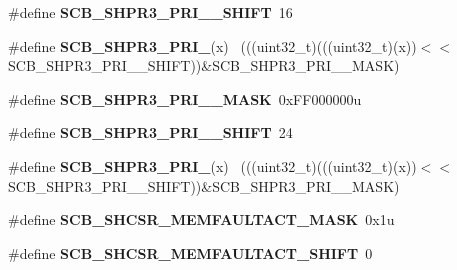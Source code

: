 \begin{DoxyCompactItemize}
\item 
\hypertarget{group___s_c_b___register___masks_ga10c07d5bebf4f0032304b2d73da48a48}{}\#define {\bfseries S\+C\+B\+\_\+\+S\+H\+P\+R3\+\_\+\+P\+R\+I\+\_\+\_\+\+S\+H\+I\+F\+T}~16\label{group___s_c_b___register___masks_ga10c07d5bebf4f0032304b2d73da48a48}

\item 
\hypertarget{group___s_c_b___register___masks_gac0a05c0c7e3f7ddc6285c653c190a2d7}{}\#define {\bfseries S\+C\+B\+\_\+\+S\+H\+P\+R3\+\_\+\+P\+R\+I\+\_}(x)                                        ~(((uint32\+\_\+t)(((uint32\+\_\+t)(x))$<$$<$S\+C\+B\+\_\+\+S\+H\+P\+R3\+\_\+\+P\+R\+I\+\_\+\_\+\+S\+H\+I\+F\+T))\&S\+C\+B\+\_\+\+S\+H\+P\+R3\+\_\+\+P\+R\+I\+\_\+\_\+\+M\+A\+S\+K)\label{group___s_c_b___register___masks_gac0a05c0c7e3f7ddc6285c653c190a2d7}

\item 
\hypertarget{group___s_c_b___register___masks_gad0d8244bc4b757250164da7a7f5406ce}{}\#define {\bfseries S\+C\+B\+\_\+\+S\+H\+P\+R3\+\_\+\+P\+R\+I\+\_\+\_\+\+M\+A\+S\+K}~0x\+F\+F000000u\label{group___s_c_b___register___masks_gad0d8244bc4b757250164da7a7f5406ce}

\item 
\hypertarget{group___s_c_b___register___masks_ga28a5f46e257ba81d93a426436b8c795a}{}\#define {\bfseries S\+C\+B\+\_\+\+S\+H\+P\+R3\+\_\+\+P\+R\+I\+\_\+\_\+\+S\+H\+I\+F\+T}~24\label{group___s_c_b___register___masks_ga28a5f46e257ba81d93a426436b8c795a}

\item 
\hypertarget{group___s_c_b___register___masks_gaab039efcc046b9e78aa68a70957a4194}{}\#define {\bfseries S\+C\+B\+\_\+\+S\+H\+P\+R3\+\_\+\+P\+R\+I\+\_}(x)                                        ~(((uint32\+\_\+t)(((uint32\+\_\+t)(x))$<$$<$S\+C\+B\+\_\+\+S\+H\+P\+R3\+\_\+\+P\+R\+I\+\_\+\_\+\+S\+H\+I\+F\+T))\&S\+C\+B\+\_\+\+S\+H\+P\+R3\+\_\+\+P\+R\+I\+\_\+\_\+\+M\+A\+S\+K)\label{group___s_c_b___register___masks_gaab039efcc046b9e78aa68a70957a4194}

\item 
\hypertarget{group___s_c_b___register___masks_gad3537ba4bbb68c7c598508c3719d7a4c}{}\#define {\bfseries S\+C\+B\+\_\+\+S\+H\+C\+S\+R\+\_\+\+M\+E\+M\+F\+A\+U\+L\+T\+A\+C\+T\+\_\+\+M\+A\+S\+K}~0x1u\label{group___s_c_b___register___masks_gad3537ba4bbb68c7c598508c3719d7a4c}

\item 
\hypertarget{group___s_c_b___register___masks_gae410ef4c07908e9e0cf55d08cac2aa35}{}\#define {\bfseries S\+C\+B\+\_\+\+S\+H\+C\+S\+R\+\_\+\+M\+E\+M\+F\+A\+U\+L\+T\+A\+C\+T\+\_\+\+S\+H\+I\+F\+T}~0\label{group___s_c_b___register___masks_gae410ef4c07908e9e0cf55d08cac2aa35}


\end{DoxyCompactItemize}
